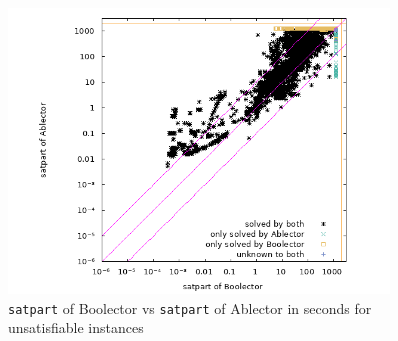 \begin{figure}[]
    \centering
        \includegraphics[width=0.9\textwidth]{plots/unsat/Boolector-vs-Ablector-satpart.png}
    \caption{\texttt{satpart} of Boolector vs \texttt{satpart} of Ablector in seconds for unsatisfiable instances}
    \label{fig:evaluation:unsat:scatter}
\end{figure}

